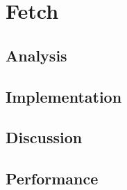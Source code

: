 \chapter{Fetch}
\section{Analysis} %
\section{Implementation} %
\section{Discussion} %
\section{Performance} %